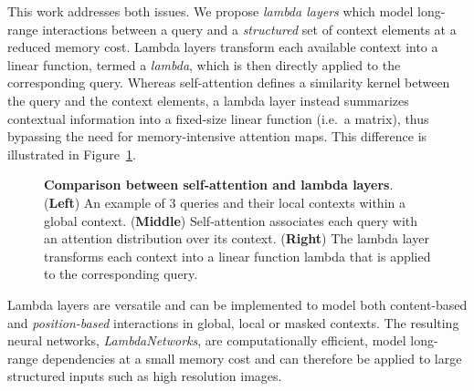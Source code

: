 \documentclass{article} \usepackage{iclr2021_conference,times}
\begin{document}
This work addresses both issues.
We propose \emph{lambda layers} which model long-range interactions between a query and a \emph{structured} set of context elements at a reduced memory cost.
Lambda layers transform each available context into a linear function, termed a \emph{lambda}, which is then directly applied to the corresponding query.
Whereas self-attention defines a similarity kernel between the query and the context elements, a lambda layer
instead summarizes contextual information into a fixed-size linear function (i.e.\ a matrix), thus bypassing the need for memory-intensive attention maps.
This difference is illustrated in Figure~\ref{fig:visual_example}.

\begin{figure}[h]
    \caption{\textbf{Comparison between self-attention and lambda layers}. 
    (\textbf{Left}) An example of 3 queries and their local contexts within a global context.
    (\textbf{Middle}) Self-attention associates each query with an attention distribution over its context.
    (\textbf{Right}) The lambda layer transforms each context into a linear function lambda that is applied to the corresponding query.}
    \label{fig:visual_example}
\end{figure}

Lambda layers are versatile and can be implemented to model both content-based and \emph{position-based} interactions in global, local or masked contexts.
The resulting neural networks, \emph{LambdaNetworks}, are computationally efficient, model long-range dependencies at a small memory cost and can therefore be applied to large structured inputs such as high resolution images.
\end{document}
